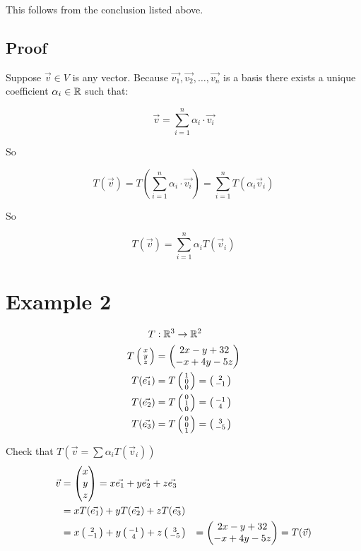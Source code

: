 \documentclass[a4paper]{article}
\begin{document}
This follows from the conclusion listed above.

\subsection*{Proof}
Suppose $\vec{v} \in V$ is any vector. Because $\vec{v_1}, \vec{v_2}, \dots, \vec{v_n}$ is a basis there exists a unique coefficient $\alpha_i \in \mathbb{R}$ such that:

\[
	\vec{v} = \sum_{i = 1}^{n}\alpha_i \cdot \vec{v_i}
\]

So 

\[
T(\vec{v}) = T\left(\sum_{i = 1}^{n}\alpha_i \cdot \vec{v_i}\right)
= \sum_{i = 1}^{n}T(\alpha_i \vec{v}_i)
\]

So

\[
	T(\vec{v}) = \sum_{i=1}^{n}\alpha_i T(\vec{v}_i)
\]

\section*{Example 2}
\[
	\begin{aligned}
T&: \mathbb{R}^3 \to \mathbb{R}^2 \\
T\left(\begin{smallmatrix} x \\ y \\ z \end{smallmatrix} \right) &= 
\begin{pmatrix}
	2x - y + 32 \\
	-x + 4y - 5z
\end{pmatrix} \\
T(\vec{e_1}) &= T\left(\begin{smallmatrix} 1\\0\\0 \end{smallmatrix} \right) = \left(\begin{smallmatrix} 2\\-1 \end{smallmatrix} \right) \\
T(\vec{e_2}) &= T\left(\begin{smallmatrix} 0\\1\\0 \end{smallmatrix} \right) = \left(\begin{smallmatrix} -1\\4 \end{smallmatrix} \right) \\
T(\vec{e_3}) &= T\left(\begin{smallmatrix} 0\\0\\1 \end{smallmatrix} \right) = \left(\begin{smallmatrix} 3\\-5 \end{smallmatrix} \right) \\
\end{aligned}
\]

Check that $T(\vec{v} = \sum \alpha_i T(\vec{v}_i))$
\[
\begin{aligned}
	\vec{v} &= 
	\begin{pmatrix}
		x\\y\\z
	\end{pmatrix} =
	x\vec{e_1} + y\vec{e_2} + z\vec{e_3} \\
	&= x T(\vec{e_1}) + y T(\vec{e_2}) + z T(\vec{e_3}) \\
	&= x \left(\begin{smallmatrix} 2 \\ -1 \end{smallmatrix} \right) + y \left(\begin{smallmatrix} -1 \\ 4 \end{smallmatrix} \right) + z \left(\begin{smallmatrix} 3 \\ -5 \end{smallmatrix} \right)
	&= 
	\begin{pmatrix}
		2x - y + 32 \\
		-x + 4y - 5z
	\end{pmatrix} =
	T(\vec{v})
\end{aligned}
\]
\end{document}
